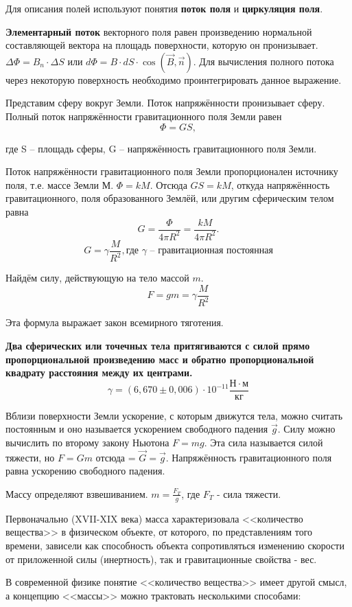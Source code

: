 \documentclass[a6paper, 11pt]{diss_4}
\renewcommand{\'}{\,'}
\begin{document}
  Для описания полей используют понятия \textbf{поток поля} и
\textbf{циркуляция поля}.

  \textbf{Элементарный поток} векторного поля равен произведению нормальной
составляющей вектора на площадь поверхности, которую он пронизывает.
$\Delta\Phi=B_n\cdot\Delta S$ или $d\Phi=B\cdot dS\cdot\cos(\vec{B},\vec{n})$.
Для вычисления полного потока через некоторую поверхность необходимо
проинтегрировать данное выражение.

  Представим сферу вокруг Земли. Поток напряжённости пронизывает сферу.
Полный поток напряжённости гравитационного поля Земли равен
\[
\Phi=GS,
\]

где S -- площадь сферы, G -- напряжённость гравитационного поля Земли.

  Поток напряжённости гравитационного поля Земли пропорционален источнику
поля, т.е. массе Земли $М$. $\Phi=kM$. Отсюда $GS = kM$, откуда напряжённость
гравитационного, поля образованного Землёй, или другим сферическим телом равна
\[
G=\frac{\Phi}{4\pi R^2}=\frac{kM}{4\pi R^2}.
\]
\[
G=\gamma\frac{M}{R^2},\text{где $\gamma$ -- гравитационная постоянная}
\]

 Найдём силу, действующую на тело массой $m$.
\[
F=gm=\gamma\frac{M}{R^2}
\]

 Эта формула выражает закон всемирного тяготения.

 \textbf{Два сферических или точечных тела притягиваются с силой прямо
пропорциональной произведению масс и обратно пропорциональной квадрату
расстояния между их центрами. }
\[
\gamma=(6,670\pm0,006)\cdot10^{-11}\frac{Н\cdot м}{кг}
\]

  Вблизи поверхности Земли ускорение, с которым движутся тела, можно считать
постоянным и оно называется ускорением свободного падения $\vec{g}$. Силу можно
 вычислить по второму закону Ньютона $F=mg$. Эта сила называется силой
тяжести, но $F=Gm$ отсюда = $\vec{G}=\vec{g}$. Напряжённость гравитационного поля равна
ускорению свободного падения.

  Массу определяют взвешиванием. $m=\frac{F_T}{g}$, где $F_T$ - сила тяжести.

 Первоначально (XVII-XIX века) масса характеризовала <<количество вещества>> в
физическом объекте, от которого, по представлениям того времени, зависели как
способность объекта сопротивляться изменению скорости от приложенной силы
(инертность), так и гравитационные свойства - вес.

 В современной физике понятие <<количество вещества>> имеет другой смысл, а
концепцию <<массы>> можно трактовать несколькими способами:
\end{document}

